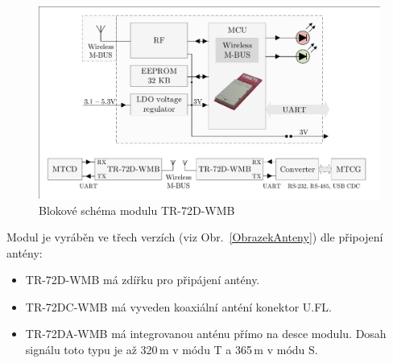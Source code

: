 \newpage

 \begin{figure}[!ht]
  \begin{center}
    \includegraphics[scale=0.6]{obrazky/modul_block}
  \end{center}
  \caption{Blokové schéma modulu TR-72D-WMB \cite{ModulIQRF}}
	\label{BlokovkaIQRF}
\end{figure}

Modul je vyráběn ve třech verzích (viz Obr.~\ref{ObrazekAnteny}) dle připojení antény:
\begin{itemize}
		\item TR-72D-WMB má zdířku pro připájení antény.
		\item TR-72DC-WMB	má vyveden koaxiální anténí konektor U.FL. 
		\item TR-72DA-WMB má integrovanou anténu přímo na desce modulu. Dosah signálu toto typu je až 320\,m v módu T a 365\,m v módu S.
\end{itemize}

